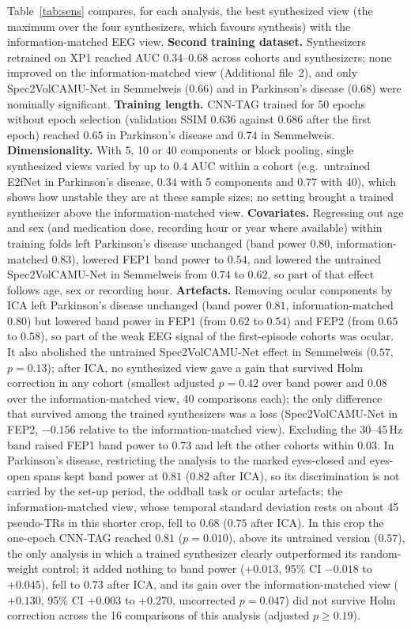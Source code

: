\documentclass[pdflatex,referee,sn-basic]{sn-jnl}%
\begin{document}
Table~\ref{tab:sens} compares, for each analysis, the best synthesized view (the maximum over the four synthesizers, which favours synthesis) with the information-matched EEG view. \textbf{Second training dataset.} Synthesizers retrained on XP1 reached AUC 0.34--0.68 across cohorts and synthesizers; none improved on the information-matched view (Additional file~2), and only Spec2VolCAMU-Net in Semmelweis ($0.66$) and in Parkinson's disease ($0.68$) were nominally significant. \textbf{Training length.} CNN-TAG trained for 50 epochs without epoch selection (validation SSIM $0.636$ against $0.686$ after the first epoch) reached $0.65$ in Parkinson's disease and $0.74$ in Semmelweis. \textbf{Dimensionality.} With 5, 10 or 40 components or block pooling, single synthesized views varied by up to $0.4$ AUC within a cohort (e.g.\ untrained E2fNet in Parkinson's disease, $0.34$ with 5 components and $0.77$ with 40), which shows how unstable they are at these sample sizes; no setting brought a trained synthesizer above the information-matched view. \textbf{Covariates.} Regressing out age and sex (and medication dose, recording hour or year where available) within training folds left Parkinson's disease unchanged (band power $0.80$, information-matched $0.83$), lowered FEP1 band power to $0.54$, and lowered the untrained Spec2VolCAMU-Net in Semmelweis from $0.74$ to $0.62$, so part of that effect follows age, sex or recording hour. \textbf{Artefacts.} Removing ocular components by ICA left Parkinson's disease unchanged (band power $0.81$, information-matched $0.80$) but lowered band power in FEP1 (from $0.62$ to $0.54$) and FEP2 (from $0.65$ to $0.58$), so part of the weak EEG signal of the first-episode cohorts was ocular. It also abolished the untrained Spec2VolCAMU-Net effect in Semmelweis ($0.57$, $p=0.13$); after ICA, no synthesized view gave a gain that survived Holm correction in any cohort (smallest adjusted $p=0.42$ over band power and $0.08$ over the information-matched view, 40 comparisons each); the only difference that survived among the trained synthesizers was a loss (Spec2VolCAMU-Net in FEP2, $-0.156$ relative to the information-matched view). Excluding the 30--45\,Hz band raised FEP1 band power to $0.73$ and left the other cohorts within $0.03$. In Parkinson's disease, restricting the analysis to the marked eyes-closed and eyes-open spans kept band power at $0.81$ ($0.82$ after ICA), so its discrimination is not carried by the set-up period, the oddball task or ocular artefacts; the information-matched view, whose temporal standard deviation rests on about 45 pseudo-TRs in this shorter crop, fell to $0.68$ ($0.75$ after ICA). In this crop the one-epoch CNN-TAG reached $0.81$ ($p=0.010$), above its untrained version ($0.57$), the only analysis in which a trained synthesizer clearly outperformed its random-weight control; it added nothing to band power ($+0.013$, 95\% CI $-0.018$ to $+0.045$), fell to $0.73$ after ICA, and its gain over the information-matched view ($+0.130$, 95\% CI $+0.003$ to $+0.270$, uncorrected $p=0.047$) did not survive Holm correction across the 16 comparisons of this analysis (adjusted $p\geq0.19$).
\end{document}
